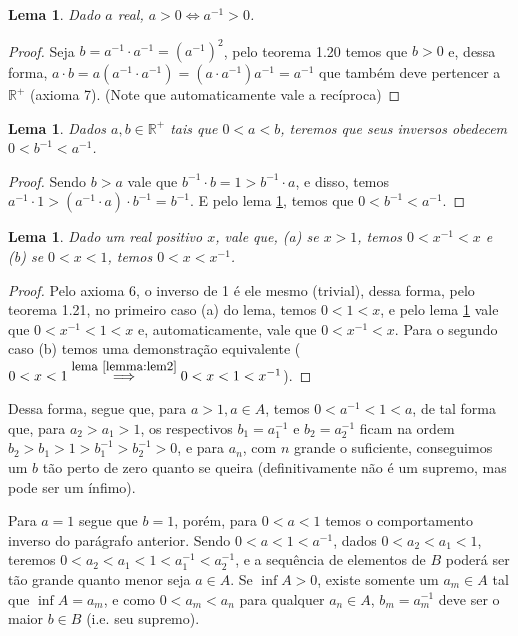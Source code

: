 \documentclass{IMTexam}
\newtheorem{lemma}[theorem]{Lema}
\begin{document}
\begin{questions}
\begin{parts}
\begin{solution}
				\begin{lemma}\label{lemma:lem1}
					Dado $ a $ real, $ a>0\iff a^{-1}>0 $.
				\end{lemma}
				
				\begin{proof}
					Seja $ b=a^{-1}\cdot a^{-1}=(a^{-1})^{2} $, pelo teorema 1.20 temos que $ b>0 $ e, dessa forma, $ a\cdot b=a(a^{-1}\cdot a^{-1})=(a\cdot a^{-1})a^{-1}=a^{-1} $ que também deve pertencer a $ \mathbb{R}^{+} $ (axioma 7). (Note que automaticamente vale a recíproca)
				\end{proof}
				
				\begin{lemma}\label{lemma:lem2}
					Dados $ a,b\in\mathbb{R}^{+} $ tais que $ 0<a<b $, teremos que seus inversos obedecem $ 0<b^{-1}<a^{-1} $.
				\end{lemma}
				
				\begin{proof}
					Sendo $ b>a $ vale que $ b^{-1}\cdot b = 1 > b^{-1}\cdot a $, e disso, temos $ a^{-1}\cdot 1 > (a^{-1}\cdot a)\cdot b^{-1}=b^{-1} $. E pelo lema \ref{lemma:lem1}, temos que $ 0<b^{-1}<a^{-1} $.
				\end{proof}
				
				\begin{lemma}
					Dado um real positivo $ x $, vale que, (a) se $ x>1 $, temos $ 0<x^{-1}<x $ e (b) se $ 0<x<1 $, temos $ 0<x<x^{-1} $.
				\end{lemma}
				
				\begin{proof}
					Pelo axioma 6, o inverso de 1 é ele mesmo (trivial), dessa forma, pelo teorema 1.21, no primeiro caso (a) do lema, temos $ 0<1<x $, e pelo lema \ref{lemma:lem2} vale que $ 0<x^{-1}<1<x $ e, automaticamente, vale que $ 0<x^{-1}<x $. Para o segundo caso (b) temos uma demonstração equivalente ($ 0<x<1\overset{\textup{\small lema \ref{lemma:lem2}}}{\implies}0<x<1<x^{-1} $).
				\end{proof}
			
				Dessa forma, segue que, para $ a>1,a\in A $, temos $ 0<a^{-1}<1<a $, de tal forma que, para $ a_2>a_1>1 $, os respectivos $ b_1=a_1^{-1} $ e $ b_2=a_2^{-1} $ ficam na ordem $ b_2>b_1>1>b_1^{-1}>b_2^{-1}>0 $, e para $ a_n $, com $ n $ grande o suficiente, conseguimos um $ b $ tão perto de zero quanto se queira (definitivamente não é um supremo, mas pode ser um ínfimo).
				
				Para $ a=1 $ segue que $ b=1 $, porém, para $ 0<a<1 $ temos o comportamento inverso do parágrafo anterior. Sendo $ 0<a<1<a^{-1} $, dados $ 0<a_2<a_1<1 $, teremos $ 0<a_2<a_1<1<a_1^{-1}<a_2^{-1} $, e a sequência de elementos de $ B $ poderá ser tão grande quanto menor seja $ a\in A $. Se $ \inf A>0 $, existe somente um $ a_m\in A $ tal que $ \inf A=a_m $, e como $ 0<a_m<a_n $ para qualquer $ a_n\in A $, $ b_m=a_m^{-1} $ deve ser o maior $ b\in B $ (i.e. seu supremo).
				

\end{solution}
\end{parts}
\end{questions}
\end{document}
